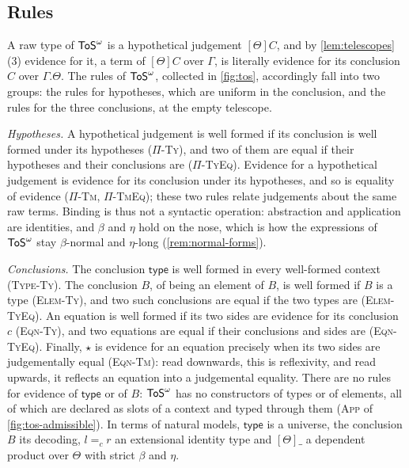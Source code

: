 \subsection{Rules}
\label{sec:tos-rules}

A raw type of $\mathsf{ToS}^\omega$ is a hypothetical judgement $[\Theta]C$, and by \cref{lem:telescopes}(3) evidence for it, a term of $[\Theta]C$ over $\Gamma$, is literally evidence for its conclusion $C$ over $\Gamma.\Theta$. The rules of $\mathsf{ToS}^\omega$, collected in \cref{fig:tos}, accordingly fall into two groups: the rules for hypotheses, which are uniform in the conclusion, and the rules for the three conclusions, at the empty telescope.

\emph{Hypotheses.} A hypothetical judgement is well formed if its conclusion is well formed under its hypotheses (\textsc{$\Pi$-Ty}), and two of them are equal if their hypotheses and their conclusions are (\textsc{$\Pi$-TyEq}). Evidence for a hypothetical judgement is evidence for its conclusion under its hypotheses, and so is equality of evidence (\textsc{$\Pi$-Tm}, \textsc{$\Pi$-TmEq}); these two rules relate judgements about the same raw terms. Binding is thus not a syntactic operation: abstraction and application are identities, and $\beta$ and $\eta$ hold on the nose, which is how the expressions of $\mathsf{ToS}^\omega$ stay $\beta$-normal and $\eta$-long (\cref{rem:normal-forms}).

\emph{Conclusions.} The conclusion $\mathsf{type}$ is well formed in every well-formed context (\textsc{Type-Ty}). The conclusion $B$, of being an element of $B$, is well formed if $B$ is a type (\textsc{Elem-Ty}), and two such conclusions are equal if the two types are (\textsc{Elem-TyEq}). An equation is well formed if its two sides are evidence for its conclusion $c$ (\textsc{Eqn-Ty}), and two equations are equal if their conclusions and sides are (\textsc{Eqn-TyEq}). Finally, $\star$ is evidence for an equation precisely when its two sides are judgementally equal (\textsc{Eqn-Tm}): read downwards, this is reflexivity, and read upwards, it reflects an equation into a judgemental equality. There are no rules for evidence of $\mathsf{type}$ or of $B$: $\mathsf{ToS}^\omega$ has no constructors of types or of elements, all of which are declared as slots of a context and typed through them (\textsc{App} of \cref{fig:tos-admissible}). In terms of natural models, $\mathsf{type}$ is a universe, the conclusion $B$ its decoding, $l =_c r$ an extensional identity type and $[\Theta]\_$ a dependent product over $\Theta$ with strict $\beta$ and $\eta$.

